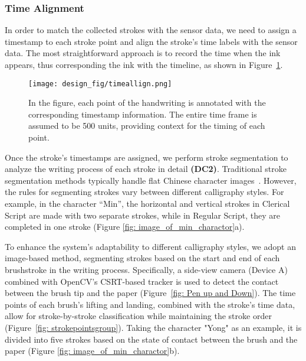 \subsubsection{Time Alignment}
In order to match the collected strokes with the sensor data, we need to assign a timestamp to each stroke point and align the stroke's time labels with the sensor data. The most straightforward approach is to record the time when the ink appears, thus corresponding the ink with the timeline, as shown in Figure~\ref{fig: TimeAlignment}.

\begin{figure}[H]
    \centering
    \texttt{[image: design\_fig/timeallign.png]}
    \caption{In the figure, each point of the handwriting is annotated with the corresponding timestamp information. The entire time frame is assumed to be 500 units, providing context for the timing of each point. }
    \label{fig: TimeAlignment}
\end{figure}

Once the stroke's timestamps are assigned, we perform stroke segmentation to analyze the writing process of each stroke in detail \textbf{(DC2)}. Traditional stroke segmentation methods typically handle flat Chinese character images~\cite{10.1145/3548608.3559239, YAO2004631}. However, the rules for segmenting strokes vary between different calligraphy styles. For example, in the character ``Min'', the horizontal and vertical strokes in Clerical Script are made with two separate strokes, while in Regular Script, they are completed in one stroke (Figure \ref{fig: image_of_min_charactor}a).

To enhance the system's adaptability to different calligraphy styles, we adopt an image-based method, segmenting strokes based on the start and end of each brushstroke in the writing process. Specifically, a side-view camera (Device A) combined with OpenCV's CSRT-based tracker is used to detect the contact between the brush tip and the paper (Figure~\ref{fig: Pen up and Down}). The time points of each brush's lifting and landing, combined with the stroke's time data, allow for stroke-by-stroke classification while maintaining the stroke order (Figure~\ref{fig: strokepointsgroup}). Taking the character "Yong" as an example, it is divided into five strokes based on the state of contact between the brush and the paper (Figure \ref{fig: image_of_min_charactor}b).





